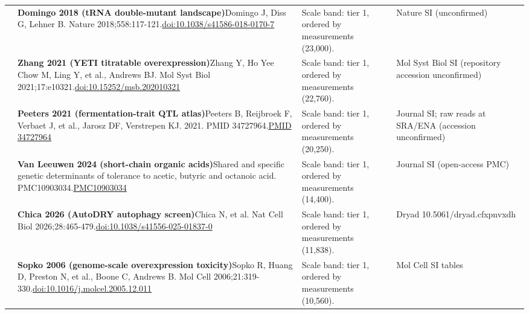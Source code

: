 \begin{landscape}
\begin{longtable}{@{}r@{\hspace{4pt}} L{86mm} L{92mm} L{62mm}@{}}
 & \textbf{Domingo 2018 (tRNA double-mutant landscape)}\newline Domingo J, Diss G, Lehner B. Nature 2018;558:117-121.\newline \href{https://doi.org/10.1038/s41586-018-0170-7}{doi:10.1038/\allowbreak s41586-018-0170-7} & Scale band: tier 1, ordered by measurements (23,000). & Nature SI (unconfirmed) \\
 & \textbf{Zhang 2021 (YETI titratable overexpression)}\newline Zhang Y, Ho Yee Chow M, Ling Y, et al., Andrews BJ. Mol Syst Biol 2021;17:e10321.\newline \href{https://doi.org/10.15252/msb.202010321}{doi:10.15252/\allowbreak msb.202010321} & Scale band: tier 1, ordered by measurements (22,760). & Mol Syst Biol SI (repository accession unconfirmed) \\
 & \textbf{Peeters 2021 (fermentation-trait QTL atlas)}\newline Peeters B, Reijbroek F, Verbaet J, et al., Jarosz DF, Verstrepen KJ. 2021. PMID 34727964.\newline \href{https://pubmed.ncbi.nlm.nih.gov/34727964/}{PMID 34727964} & Scale band: tier 1, ordered by measurements (20,250). & Journal SI; raw reads at SRA/\allowbreak ENA (accession unconfirmed) \\
 & \textbf{Van Leeuwen 2024 (short-chain organic acids)}\newline Shared and specific genetic determinants of tolerance to acetic, butyric and octanoic acid. PMC10903034.\newline \href{https://www.ncbi.nlm.nih.gov/pmc/articles/PMC10903034/}{PMC10903034} & Scale band: tier 1, ordered by measurements (14,400). & Journal SI (open-access PMC) \\
 & \textbf{Chica 2026 (AutoDRY autophagy screen)}\newline Chica N, et al. Nat Cell Biol 2026;28:465-479.\newline \href{https://doi.org/10.1038/s41556-025-01837-0}{doi:10.1038/\allowbreak s41556-025-01837-0} & Scale band: tier 1, ordered by measurements (11,838). & Dryad 10.5061/\allowbreak dryad.cfxpnvxdh \\
 & \textbf{Sopko 2006 (genome-scale overexpression toxicity)}\newline Sopko R, Huang D, Preston N, et al., Boone C, Andrews B. Mol Cell 2006;21:319-330.\newline \href{https://doi.org/10.1016/j.molcel.2005.12.011}{doi:10.1016/\allowbreak j.molcel.2005.12.011} & Scale band: tier 1, ordered by measurements (10,560). & Mol Cell SI tables \\

\end{longtable}
\end{landscape}
